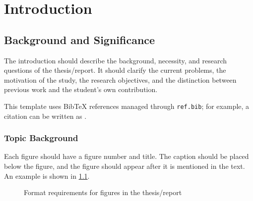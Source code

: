 \chapter{Introduction}

\section{Background and Significance}
The introduction should describe the background, necessity, and research questions of the thesis/report. It should clarify the current problems, the motivation of the study, the research objectives, and the distinction between previous work and the student's own contribution.

This template uses BibTeX references managed through \texttt{ref.bib}; for example, a citation can be written as \cite{lecun2015deep}.

\subsection{Topic Background}
Each figure should have a figure number and title. The caption should be placed below the figure, and the figure should appear after it is mentioned in the text. An example is shown in \cref{fig:format}.

\begin{figure}[htbp]
  \centering
  \caption{Format requirements for figures in the thesis/report}
  \label{fig:format}
\end{figure}
